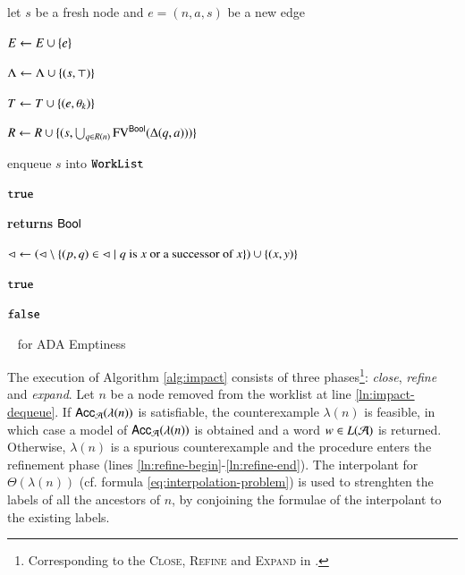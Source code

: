 \documentclass[10pt]{llncs}
\begin{document}
\begin{algorithm}[t!]
{\begin{algorithmic}[1]
  \EndIf %

  \EndIf %

  \EndFor 

  \EndIf %


  \label{ln:expand-begin}

  \State let $s$ be a fresh node and $e = (n,a,s)$ be a new edge

  \State $E \leftarrow E \cup \left\{ e \right\}$
  \label{ln:edge-insert}

  \State $\Lambda \leftarrow \Lambda \cup \left\{ (s,\top) \right\}$

  \State $T \leftarrow T \cup \left\{ (e, \theta_k) \right\}$

  \State $R \leftarrow R \cup \{(s,\bigcup_{q \in R(n)}\mathrm{FV}^{\mathsf{Bool}}(\Delta(q,a)))\}$

  \State enqueue $s$ into $\mathtt{WorkList}$
  \label{ln:expand-end}

  \EndFor

  \EndIf %

  \EndWhile  

   $\mathtt{true}$
\end{algorithmic}

\begin{algorithmic}[1]
 {\bf returns} $\mathsf{Bool}$


\label{ln:entailment2}

\State $\lhd \leftarrow \left(\lhd \setminus \left\{  (p,q) \in \lhd \mid
  \text{$q$ is $x$ or a successor of $x$} \right\}\right) \cup \left\{ (x,y) \right\}$
\label{ln:close-uncover}

 $\mathtt{true}$ 

\EndIf

\EndFor

 $\mathtt{false}$

\EndFunction
\end{algorithmic}}
\caption{\impact~ for ADA Emptiness}
\label{alg:impact}
\end{algorithm}

The execution of Algorithm \ref{alg:impact} consists of three
phases\footnote{Corresponding to the \textsc{Close}, \textsc{Refine}
  and \textsc{Expand} in \cite{mcmillan06}.}: \emph{close},
\emph{refine} and \emph{expand}. Let $n$ be a node removed from the
worklist at line \ref{ln:impact-dequeue}. If $\mathsf{Acc}_{\mathcal{A}}(\lambda(n))$
is satisfiable, the counterexample $\lambda(n)$ is feasible, in which
case a model of $\mathsf{Acc}_{\mathcal{A}}(\lambda(n))$ is obtained and a word $w
\in L(\mathcal{A})$ is returned. Otherwise, $\lambda(n)$ is a spurious
counterexample and the procedure enters the refinement phase (lines
\ref{ln:refine-begin}-\ref{ln:refine-end}). The interpolant for
$\Theta(\lambda(n))$ (cf. formula \ref{eq:interpolation-problem}) is
used to strenghten the labels of all the ancestors of $n$, by
conjoining the formulae of the interpolant to the existing labels.
\end{document}
